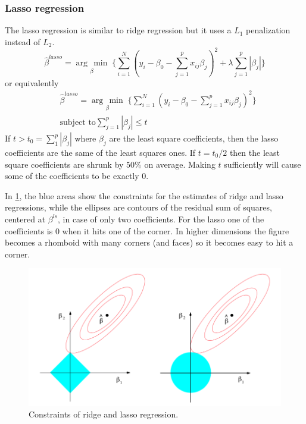 \documentclass[12pt, letterpaper]{article}
\theoremstyle{definition}
\newcommand{\argmin}[1]{\underset{#1}{\operatorname{arg}\,\operatorname{min}}\;}
\begin{document}
\subsubsection{Lasso regression}
The lasso regression is similar to ridge regression but it uses a $L_1$ penalization instead of $L_2$.
\begin{equation}
\label{blasso}
\hat{\beta}^{lasso} = \argmin{\beta} \Bigg\lbrace \sum_{i=1}^N \left( y_i -  \beta_0 - \sum_{j=1}^p x_{ij} \beta_j\right)^2+ \lambda \sum_{j=1}^p |\beta_j| \Bigg\rbrace
\end{equation}
or equivalently
\begin{equation}
\begin{aligned}
&\hat{\beta}^{lasso} = \argmin{\beta} \Bigg\lbrace \sum_{i=1}^N \left( y_i -  \beta_0 - \sum_{j=1}^p x_{ij} \beta_j\right)^2 \Bigg\rbrace\\
&\text{subject to} \sum_{j=1}^p |\beta_j| \le t
\end{aligned}
\end{equation}
If $t>t_0= \sum_1^p |\beta_j|$ where $\beta_j$ are the least square coefficients, then the lasso coefficients are the same of the least squares ones. If $t=t_0/2$ then the least square coefficients are shrunk by $50\%$ on average. Making $t$ sufficiently will cause some of the coefficients to be exactly $0$.

In \ref{ridge_lasso}, the blue areas show the constraints for the estimates of ridge and lasso regressions, while the ellipses are contours of the residual sum of squares, centered at $\beta^{ls}$, in case of only two coefficients. For the lasso one of the coefficients is $0$ when it hits one of the corner. In higher dimensions the figure becomes a rhomboid with many corners (and faces) so it becomes easy to hit a corner. 
\begin{figure}
\label{ridge_lasso}
\includegraphics[scale=0.4]{img/ridge_lasso}
\caption{Constraints of ridge and lasso regression.}
\end{figure}
\end{document}
